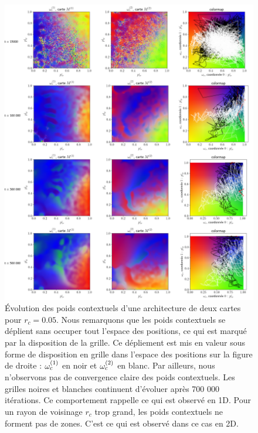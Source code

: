 \documentclass[../main]{subfiles}
\begin{document}
\begin{figure}[p]
	\includegraphics[width=\textwidth]{2SOM_sphere_rc005_evol}
	\caption{\'Evolution des poids contextuels d'une architecture de deux cartes pour $r_c =0.05$. 
	Nous remarquons que les poids contextuels se déplient sans occuper tout l'espace des positions, ce qui est marqué par la disposition de la grille. Ce dépliement est mis en valeur sous forme de disposition en grille dans l'espace des positions sur la figure de droite : $\omega_c^{({1})}$ en noir et $\omega_c^{({2})}$ en blanc. Par ailleurs, nous n'observons pas de convergence claire des poids contextuels. Les grilles noires et blanches continuent d'évoluer après 700 000 itérations.
	Ce comportement rappelle ce qui est observé en 1D. Pour un rayon de voisinage $r_c$ trop grand, les poids contextuels ne forment pas de zones. C'est ce qui est observé dans ce cas en 2D.
	\label{fig:rc_005}}
\end{figure}
\end{document}

